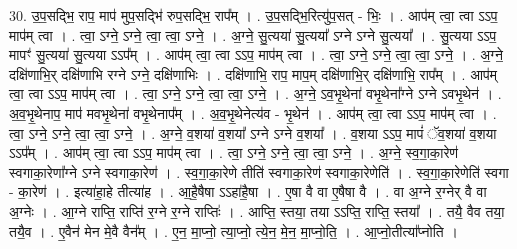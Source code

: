 \documentclass[17pt]{extarticle}
\begin{document}
30. उ॒प॒सद्भि॒ राप॒ माप॑ मुप॒सद्भि॑ रुप॒सद्भि॒ राप᳚म् । . उ॒प॒सद्भि॒रित्यु॑प॒सत् - भिः॒ । . आप॑म् त्वा॒ त्वा ऽऽप॒ माप॑म् त्वा । . त्वा॒ ऽग्ने॒ ऽग्ने॒ त्वा॒ त्वा॒ ऽग्ने॒ । . अ॒ग्ने॒ सु॒त्यया॑ सु॒त्यया᳚ ऽग्ने ऽग्ने सु॒त्यया᳚ । . सु॒त्यया ऽऽप॒ मापꣳ॑ सु॒त्यया॑ सु॒त्यया ऽऽप᳚म् । . आप॑म् त्वा॒ त्वा ऽऽप॒ माप॑म् त्वा । . त्वा॒ ऽग्ने॒ ऽग्ने॒ त्वा॒ त्वा॒ ऽग्ने॒ । . अ॒ग्ने॒ दक्षि॑णाभि॒र् दक्षि॑णाभि रग्ने ऽग्ने॒ दक्षि॑णाभिः । . दक्षि॑णाभि॒ राप॒ माप॒म् दक्षि॑णाभि॒र् दक्षि॑णाभि॒ राप᳚म् । . आप॑म् त्वा॒ त्वा ऽऽप॒ माप॑म् त्वा । . त्वा॒ ऽग्ने॒ ऽग्ने॒ त्वा॒ त्वा॒ ऽग्ने॒ । . अ॒ग्ने॒ ऽव॒भृ॒थेना॑ वभृ॒थेना᳚ग्ने ऽग्ने ऽवभृ॒थेन॑ । . अ॒व॒भृ॒थेनाप॒ माप॑ मवभृ॒थेना॑ वभृ॒थेनाप᳚म् । . अ॒व॒भृ॒थेनेत्य॑व - भृ॒थेन॑ । . आप॑म् त्वा॒ त्वा ऽऽप॒ माप॑म् त्वा । . त्वा॒ ऽग्ने॒ ऽग्ने॒ त्वा॒ त्वा॒ ऽग्ने॒ । . अ॒ग्ने॒ व॒शया॑ व॒शया᳚ ऽग्ने ऽग्ने व॒शया᳚ । . व॒शया ऽऽप॒ मापं॑ ॅव॒शया॑ व॒शया ऽऽप᳚म् । . आप॑म् त्वा॒ त्वा ऽऽप॒ माप॑म् त्वा । . त्वा॒ ऽग्ने॒ ऽग्ने॒ त्वा॒ त्वा॒ ऽग्ने॒ । . अ॒ग्ने॒ स्व॒गा॒का॒रेण॑ स्वगाका॒रेणा᳚ग्ने ऽग्ने स्वगाका॒रेण॑ । . स्व॒गा॒का॒रेणे तीति॑ स्वगाका॒रेण॑ स्वगाका॒रेणेति॑ । . स्व॒गा॒का॒रेणेति॑ स्वगा - का॒रेण॑ । . इत्या॑हा॒हे तीत्या॑ह । . आ॒है॒षैषा ऽऽहा॑है॒षा । . ए॒षा वै वा ए॒षैषा वै । . वा अ॒ग्ने र॒ग्नेर् वै वा अ॒ग्नेः । . आ॒ग्ने राप्ति॒ राप्ति॑ र॒ग्ने र॒ग्ने राप्तिः॑ । . आप्ति॒ स्तया॒ तया ऽऽप्ति॒ राप्ति॒ स्तया᳚ । . तयै॒ वैव तया॒ तयै॒व । . ए॒वैन॑ मेन मे॒वै वैन᳚म् । . ए॒न॒ मा॒प्नो॒ त्या॒प्नो॒ त्ये॒न॒ मे॒न॒ मा॒प्नो॒ति॒ । . आ॒प्नो॒तीत्या᳚प्नोति । \newline
\end{document}
